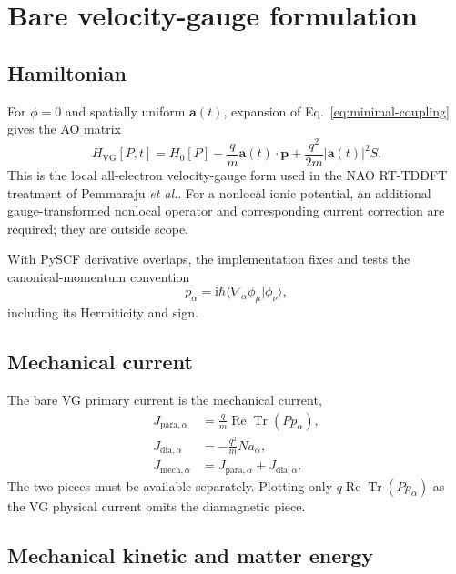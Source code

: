 \documentclass[11pt]{article}
\newcommand{\ii}{\mathrm{i}}
\newcommand{\ReTr}{\operatorname{Re}\operatorname{Tr}}
\newcommand{\vect}[1]{\bm{#1}}
\begin{document}
\section{Bare velocity-gauge formulation}

\subsection{Hamiltonian}

For \(\phi=0\) and spatially uniform \(\vect a(t)\), expansion of
Eq.~\eqref{eq:minimal-coupling} gives the AO matrix
\begin{equation}
 H_{\mathrm{VG}}[P,t]
 =H_0[P]
 -\frac q m\vect a(t)\cdot\vect p
 +\frac{q^2}{2m}|\vect a(t)|^2S.
 \label{eq:vg-hamiltonian}
\end{equation}
This is the local all-electron velocity-gauge form used in the NAO
RT-TDDFT treatment of Pemmaraju \emph{et al.}\cite{Pemmaraju2018}. For a
nonlocal ionic potential, an additional gauge-transformed nonlocal operator
and corresponding current correction are required; they are outside scope.

With PySCF derivative overlaps, the implementation fixes and tests the
canonical-momentum convention
\begin{equation}
 p_\alpha=\ii\hbar
 \langle\nabla_\alpha\phi_\mu\vert\phi_\nu\rangle,
\end{equation}
including its Hermiticity and sign.

\subsection{Mechanical current}

The bare VG primary current is the mechanical current,
\begin{align}
 J_{\mathrm{para},\alpha}
   &=\frac q m\ReTr(Pp_\alpha),\label{eq:vg-jpara}\\
 J_{\mathrm{dia},\alpha}
   &=-\frac{q^2}{m}N a_\alpha,\label{eq:vg-jdia}\\
 J_{\mathrm{mech},\alpha}
   &=J_{\mathrm{para},\alpha}+J_{\mathrm{dia},\alpha}.
 \label{eq:vg-current}
\end{align}
The two pieces must be available separately. Plotting only
\(q\ReTr(Pp_\alpha)\) as the VG physical current omits the diamagnetic
piece.

\subsection{Mechanical kinetic and matter energy}
\end{document}
